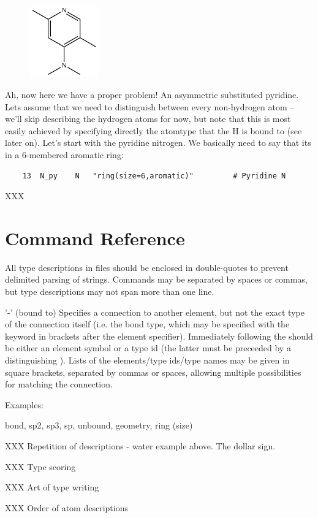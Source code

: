 \begin{figure} \includegraphics[width=3cm]{images/aromatic} \end{figure}
Ah, now here we have a proper problem! An asymmetric substituted pyridine. Lets assume that we need to distinguish between every non-hydrogen atom  -- we'll skip describing the hydrogen atoms for now, but note that this is most easily achieved by specifying directly the atomtype that the H is bound to (see later on). Let's start with the pyridine nitrogen. We basically need to say that its in a 6-membered aromatic ring:

\begin{verbatim}
    13	N_py	N	"ring(size=6,aromatic)"			# Pyridine N
\end{verbatim}

XXX

\section{Command Reference}
\label{sec:typingcommands}

All type descriptions in files should be enclosed in double-quotes to prevent delimited parsing of strings. Commands may be separated by spaces or commas, but type descriptions may not span more than one line.

'-' (bound to)
Specifies a connection to another element, but not the exact type of the connection itself (i.e. the bond type, which may be specified with the  keyword in brackets after the element specifier). Immediately following the \qte{--} should be either an element symbol or a type id (the latter must be preceeded by a distinguishing \qte{\$}). Lists of the elements/type ids/type names may be given in square brackets, separated by commas or spaces, allowing multiple possibilities for matching the connection.

Examples:



bond, sp2, sp3, sp, unbound, geometry, ring (size)


XXX Repetition of descriptions - water example above. The dollar sign.

XXX Type scoring

XXX Art of type writing

XXX Order of atom descriptions



